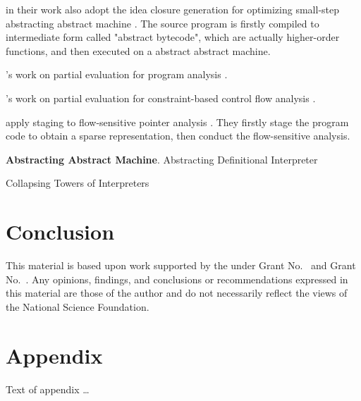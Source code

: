 \documentclass[sigplan,anonymous,review]{acmart}
\begin{document}
\citeauthor{Johnson:2013:OAA:2500365.2500604} in their work also adopt the 
idea closure generation for optimizing small-step abstracting abstract machine
\cite{Johnson:2013:OAA:2500365.2500604}. The source program is firstly compiled
to intermediate form called "abstract bytecode", which are actually higher-order functions, 
and then executed on a abstract abstract machine.

\citeauthor{damian1999partial}'s work on partial evaluation for program analysis \cite{damian1999partial}.

\citeauthor{amtoft1999partial}'s work on partial evaluation for constraint-based 
control flow analysis \cite{amtoft1999partial}.

\citeauthor{hardekopf2011flow} apply staging to flow-sensitive pointer analysis \cite{hardekopf2011flow}. 
They firstly stage the program code to obtain a sparse representation, then conduct
the flow-sensitive analysis. 

\textbf{Abstracting Abstract Machine}. Abstracting Definitional Interpreter \cite{darais2017abstracting}

Collapsing Towers of Interpreters\cite{Amin:2017:CTI:3177123.3158140}

\section{Conclusion}

\begin{acks}                            %
  This material is based upon work supported by the
   under Grant
  No.~ and Grant
  No.~.  Any opinions, findings, and
  conclusions or recommendations expressed in this material are those
  of the author and do not necessarily reflect the views of the
  National Science Foundation.
\end{acks}



\appendix
\section{Appendix}

Text of appendix \ldots
\end{document}
